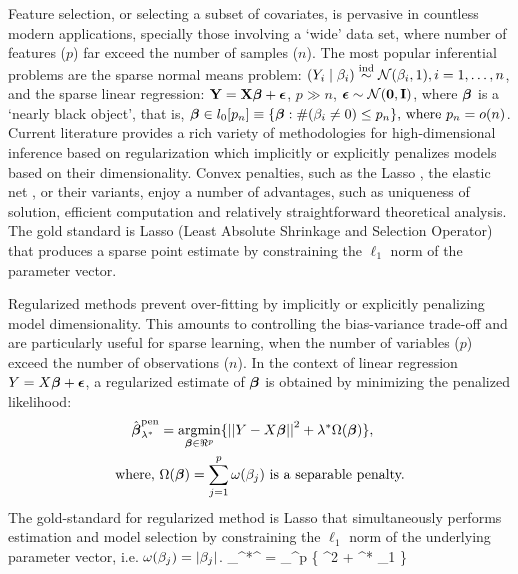 \documentclass[10pt]{article}
\begin{document}
Feature selection, or selecting a subset of covariates, is pervasive in countless modern applications, specially those involving a `wide' data set, where number of features ($p$) far exceed the number of samples ($n$). The most popular inferential problems are the sparse normal means problem: $(Y_i \mid \beta_i)  \stackrel{\mathrm{ind}}{\sim} \mathcal{N} (\beta_i,1), i = 1, \dots, n$, and the sparse linear regression: ${\bf Y} = {\bf X} \boldsymbol{\beta} + \boldsymbol{\epsilon}$, $p \gg n$, $\boldsymbol{\epsilon} \sim \mathcal{N}({\bf 0}, {\bf I})$, where $\boldsymbol{\beta}$ is a `nearly black object', that is, $\boldsymbol{\beta} \in l_0 [ p_n] \equiv \{ \boldsymbol{\beta} : \# ( \beta_i \neq 0 ) \leq p_n \}, \, \text{where } p_n = o(n) $. Current literature provides a rich variety of methodologies for high-dimensional inference based on regularization which implicitly or explicitly penalizes models based on their dimensionality. Convex penalties, such as the Lasso \citep{tibshirani96}, the elastic net \citep{zou2005regularization}, or their variants, enjoy a number of advantages, such as uniqueness of solution, efficient computation and relatively straightforward theoretical analysis. The gold standard is Lasso (Least Absolute Shrinkage and Selection Operator) that produces a sparse point estimate by constraining the $\ell_1$ norm of the parameter vector.  


Regularized methods prevent over-fitting by implicitly or explicitly penalizing model dimensionality. This amounts to controlling the bias-variance trade-off and are particularly useful for sparse learning, when the number of variables ($p$) exceed the number of observations ($n$). In the context of linear regression $Y = X \boldsymbol{\beta} + \boldsymbol{\epsilon}$, a regularized estimate of $\boldsymbol{\beta}$ is obtained by minimizing the penalized likelihood:
\begin{align}
\hat{\bbeta}_{\lambda^*}^{\text{pen}} & = \argmin_{\bbeta \in \Re^p} \{ \vectornorm{Y - X\bbeta}^2 + \lambda^* \Omega(\bbeta) \}, \label{eq:penalize} \\
  \text{where, } & \Omega(\bbeta) = \sum_{j=1}^{p} \omega(\beta_j) \text{ is a separable penalty.} \nonumber
\end{align}
The gold-standard for regularized method is Lasso that simultaneously performs estimation and model selection by constraining the $\ell_1$ norm of the underlying parameter vector, i.e. $\omega(\beta_j) = \lvert\beta_j\rvert$. 
\beq
\hat{\bbeta}_{\lambda^*}^{} = \argmin_{\bbeta \in \Re^p} \{ ^2 + \lambda^* \norm{\bbeta}_1 \} \label{eq:lasso}
\eeq
\end{document}
